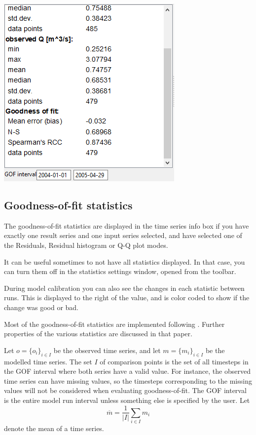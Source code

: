 \documentclass[11pt]{article}
\theoremstyle{definition}
\begin{document}
\begin{center}
\includegraphics[width=0.3\linewidth]{img/scr3}
\end{center}

\subsection{Goodness-of-fit statistics}\label{sec:gof}

The goodness-of-fit statistics are displayed in the time series info box if you have exactly one result series and one input series selected, and have selected one of the Residuals, Residual histogram or Q-Q plot modes.

It can be useful sometimes to not have all statistics displayed. In that case, you can turn them off in the statistics settings window, opened from the toolbar.

During model calibration you can also see the changes in each statistic between runs. This is displayed to the right of the value, and is color coded to show if the change was good or bad.

Most of the goodness-of-fit statistics are implemented following \cite{krause05}. Further properties of the various statistics are discussed in that paper.

Let $o=\{o_i\}_{i\in I}$ be the observed time series, and let $m=\{m_i\}_{i\in I}$ be the modelled time series. The set $I$ of comparison points is the set of all timesteps in the GOF interval where both series have a valid value. For instance, the observed time series can have missing values, so the timesteps corresponding to the missing values will not be considered when evaluating goodness-of-fit. The GOF interval is the entire model run interval unless something else is specified by the user. Let
\[
\overline{m} = \frac{1}{|I|}\sum_{i\in I}m_i
\]
denote the mean of a time series.
\end{document}
